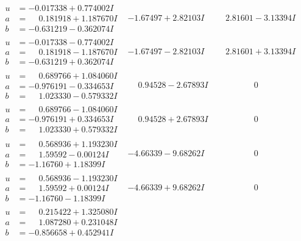 \documentclass[1p]{elsarticle_modified}
\theoremstyle{definition}
\begin{document}
$$\begin{array}{c|c|c}
\begin{aligned}
u &= -0.017338 + 0.774002 I \\
a &= \phantom{-}0.181918 + 1.187670 I \\
b &= -0.631219 - 0.362074 I\end{aligned}
 & -1.67497 + 2.82103 I & \phantom{-}2.81601 - 3.13394 I \\ \hline\begin{aligned}
u &= -0.017338 - 0.774002 I \\
a &= \phantom{-}0.181918 - 1.187670 I \\
b &= -0.631219 + 0.362074 I\end{aligned}
 & -1.67497 - 2.82103 I & \phantom{-}2.81601 + 3.13394 I \\ \hline\begin{aligned}
u &= \phantom{-}0.689766 + 1.084060 I \\
a &= -0.976191 - 0.334653 I \\
b &= \phantom{-}1.023330 - 0.579332 I\end{aligned}
 & \phantom{-}0.94528 - 2.67893 I & \phantom{-0.000000 } 0 \\ \hline\begin{aligned}
u &= \phantom{-}0.689766 - 1.084060 I \\
a &= -0.976191 + 0.334653 I \\
b &= \phantom{-}1.023330 + 0.579332 I\end{aligned}
 & \phantom{-}0.94528 + 2.67893 I & \phantom{-0.000000 } 0 \\ \hline\begin{aligned}
u &= \phantom{-}0.568936 + 1.193230 I \\
a &= \phantom{-}1.59592 - 0.00124 I \\
b &= -1.16760 + 1.18399 I\end{aligned}
 & -4.66339 - 9.68262 I & \phantom{-0.000000 } 0 \\ \hline\begin{aligned}
u &= \phantom{-}0.568936 - 1.193230 I \\
a &= \phantom{-}1.59592 + 0.00124 I \\
b &= -1.16760 - 1.18399 I\end{aligned}
 & -4.66339 + 9.68262 I & \phantom{-0.000000 } 0 \\ \hline\begin{aligned}
u &= \phantom{-}0.215422 + 1.325080 I \\
a &= \phantom{-}1.087280 + 0.231048 I \\
b &= -0.856658 + 0.452941 I\end{aligned}

\end{array}$$
\end{document}
